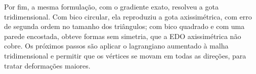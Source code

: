 \documentclass[12pt, oneside, a4paper, english, brazil]{abntex2}
\theoremstyle{relatorio}
\theoremstyle{relatorioit}
\theoremstyle{problema}
\begin{document}
Por fim, a mesma formulação, com o gradiente exato, resolveu a gota tridimensional.
Com bico circular, ela reproduziu a gota axissimétrica, com erro de segunda ordem no
tamanho dos triângulos; com bico quadrado e com uma parede encostada, obteve formas
sem simetria, que a EDO axissimétrica não cobre. Os próximos passos são aplicar o
lagrangiano aumentado à malha tridimensional e permitir que os vértices se movam em
todas as direções, para tratar deformações maiores.

\printbibliography[heading=bibintoc, title={Referências}]
\end{document}
